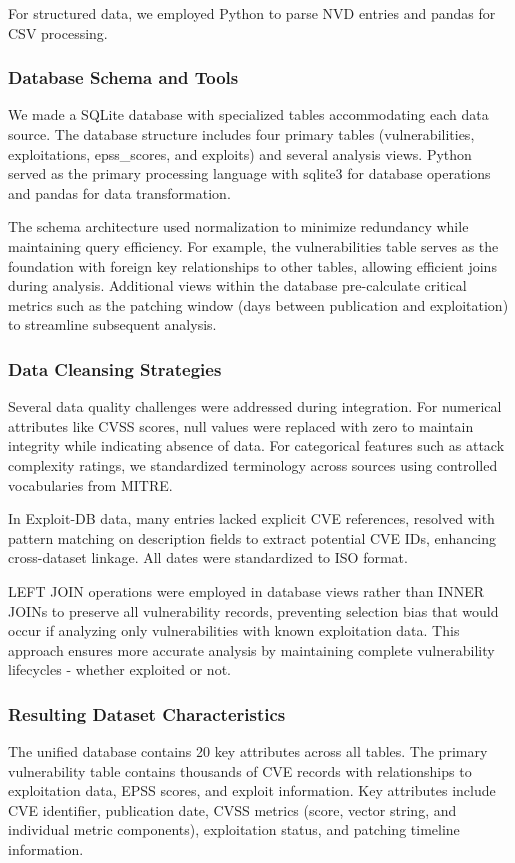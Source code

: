 \documentclass[runningheads]{llncs}
\begin{document}
For structured data, we employed Python to parse NVD entries and pandas for CSV processing.

\subsubsection{Database Schema and Tools}
We made a SQLite database with specialized tables accommodating each data source. The database structure includes four primary tables (vulnerabilities, exploitations, epss\_scores, and exploits) and several analysis views. Python served as the primary processing language with sqlite3 for database operations and pandas for data transformation.

The schema architecture used normalization to minimize redundancy while maintaining query efficiency. For example, the vulnerabilities table serves as the foundation with foreign key relationships to other tables, allowing efficient joins during analysis. Additional views within the database pre-calculate critical metrics such as the patching window (days between publication and exploitation) to streamline subsequent analysis.

\subsubsection{Data Cleansing Strategies}
Several data quality challenges were addressed during integration. For numerical attributes like CVSS scores, null values were replaced with zero to maintain integrity while indicating absence of data. For categorical features such as attack complexity ratings, we standardized terminology across sources using controlled vocabularies from MITRE.

In Exploit-DB data, many entries lacked explicit CVE references, resolved with pattern matching on description fields to extract potential CVE IDs, enhancing cross-dataset linkage. All dates were standardized to ISO format. 

LEFT JOIN operations were employed in database views rather than INNER JOINs to preserve all vulnerability records, preventing selection bias that would occur if analyzing only vulnerabilities with known exploitation data. This approach ensures more accurate analysis by maintaining complete vulnerability lifecycles - whether exploited or not.

\subsubsection{Resulting Dataset Characteristics}
The unified database contains 20 key attributes across all tables. The primary vulnerability table contains thousands of CVE records with relationships to exploitation data, EPSS scores, and exploit information. Key attributes include CVE identifier, publication date, CVSS metrics (score, vector string, and individual metric components), exploitation status, and patching timeline information.
\end{document}
